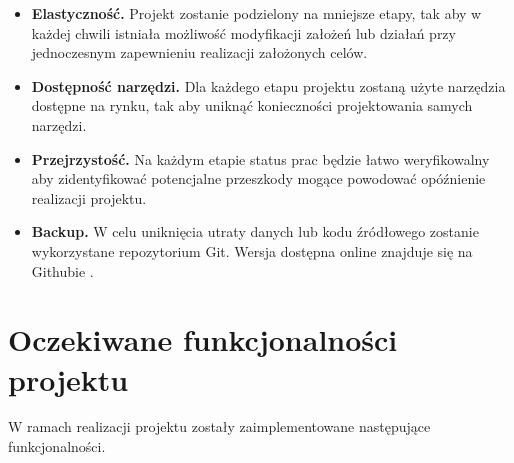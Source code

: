 \documentclass[a4paper,12pt,reqno]{article}
\begin{document}
\begin{itemize}
	\item \textbf{Elastyczność.} Projekt zostanie podzielony na mniejsze etapy, tak aby w każdej chwili istniała możliwość modyfikacji założeń lub działań przy jednoczesnym zapewnieniu realizacji założonych celów.
	\item \textbf{Dostępność narzędzi.} Dla każdego etapu projektu zostaną użyte narzędzia dostępne na rynku, tak aby uniknąć konieczności projektowania samych narzędzi.
	\item \textbf{Przejrzystość.} Na każdym etapie status prac będzie łatwo weryfikowalny aby zidentyfikować potencjalne przeszkody mogące powodować opóźnienie realizacji projektu.
	\item \textbf{Backup.} W celu uniknięcia utraty danych lub kodu źródłowego zostanie wykorzystane repozytorium Git. Wersja dostępna online znajduje się na Githubie \cite{moj_github}.
\end{itemize}

\newpage
\section{Oczekiwane funkcjonalności projektu} \label{section:oczekiwania}

W ramach realizacji projektu zostały zaimplementowane następujące funkcjonalności.
\end{document}
